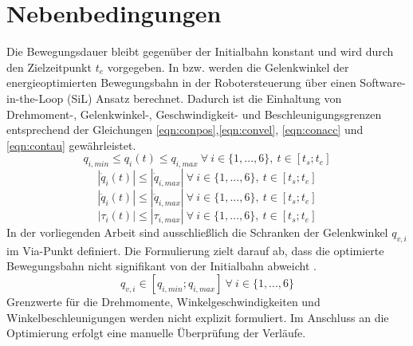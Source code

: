 \section{Nebenbedingungen}
\label{sec:Nebenbedingungen}
Die Bewegungsdauer bleibt gegenüber der Initialbahn konstant und wird durch den Zielzeitpunkt $t_e$ vorgegeben. 
In \cite[S.~40]{Eggers.2019} bzw. \cite[S.~5]{Hansen.2012} werden die Gelenkwinkel der energieoptimierten Bewegungsbahn in der Robotersteuerung über einen Software-in-the-Loop (SiL) Ansatz berechnet. Dadurch ist die Einhaltung von Drehmoment-, Gelenkwinkel-, Geschwindigkeit- und Beschleunigungsgrenzen entsprechend der Gleichungen \ref{eqn:conpos},\ref{eqn:convel}, \ref{eqn:conacc} und \ref{eqn:contau} gewährleistet. 
%
\begin{equation}
	\label{eqn:conpos}
	q_{i,min} \leq q_{i}(t) \leq q_{i,max}  ~\forall~ i \in \{1,...,6\},~ t \in [t_s;t_e]
\end{equation}
%
\begin{equation}
	\label{eqn:convel}
	|\dot{q}_{i}(t)| \leq |\dot{q}_{i,max}|  ~\forall~ i \in \{1,...,6\},~ t \in [t_s;t_e]
\end{equation}
%
\begin{equation}
	\label{eqn:conacc}
	| \ddot{q}_{i}(t)| \leq |\ddot{q}_{i,max}|  ~\forall~ i \in \{1,...,6\}, ~t \in [t_s;t_e]
\end{equation}
%
\begin{equation}
	\label{eqn:contau}
	|\tau_{i}(t)| \leq |\tau_{i,max}|  ~\forall~ i \in \{1,...,6\},~ t \in [t_s;t_e]
\end{equation}
%
In der vorliegenden Arbeit sind ausschließlich die Schranken der Gelenkwinkel $q_{v,i}$ im Via-Punkt definiert. Die Formulierung zielt darauf ab, dass die optimierte Bewegungsbahn nicht signifikant von der Initialbahn abweicht \cite[S.~5]{Hansen.2012}.
\begin{equation}
	\label{eqn:Schranken}
	q_{v,i} \in [q_{i,min};q_{i,max}] ~\forall~ i \in \{1,...,6\}
\end{equation}
Grenzwerte für die Drehmomente, Winkelgeschwindigkeiten und Winkelbeschleunigungen werden nicht explizit formuliert.  Im Anschluss an die Optimierung erfolgt eine manuelle Überprüfung der Verläufe.
%
